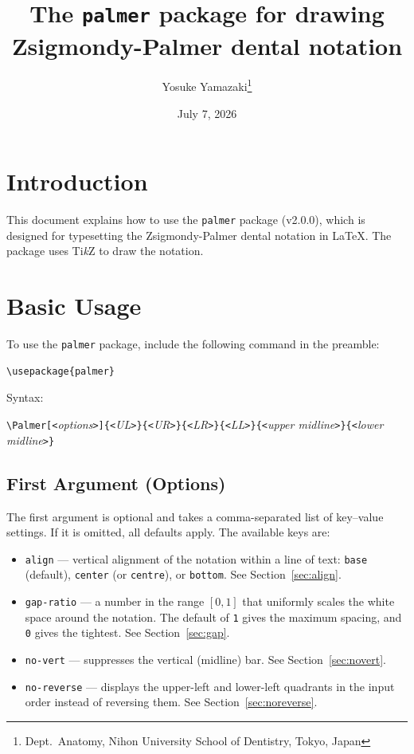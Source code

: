 \documentclass[12pt]{ltjsarticle}
\begin{document}
\title{The \texttt{palmer} package for drawing Zsigmondy-Palmer dental notation}
\author{Yosuke Yamazaki\thanks{Dept.\ Anatomy, Nihon University School of Dentistry, Tokyo, Japan}}
\date{July 7, 2026}

\maketitle

\section{Introduction}
This document explains how to use the \texttt{palmer} package (v2.0.0), which is designed for typesetting the Zsigmondy-Palmer dental notation in \LaTeX. The package uses Ti\textit{k}Z to draw the notation.


\section{Basic Usage}
To use the \texttt{palmer} package, include the following command in the preamble:

\begin{verbatim}
\usepackage{palmer}
\end{verbatim}

Syntax:

    \verb|\Palmer[<|\textit{options}\verb|>]{<|\textit{UL}\verb|>}{<|\textit{UR}\verb|>}{<|\textit{LR}\verb|>}{<|\textit{LL}\verb|>}{<|\textit{upper midline}\verb|>}{<|\textit{lower midline}\verb|>}|


\subsection{First Argument (Options)}
\label{sec:options}

The first argument is optional and takes a comma-separated list of key--value settings. If it is omitted, all defaults apply. The available keys are:

\begin{itemize}
    \item \texttt{align} --- vertical alignment of the notation within a line of text: \texttt{base} (default), \texttt{center} (or \texttt{centre}), or \texttt{bottom}. See Section~\ref{sec:align}.
    \item \texttt{gap-ratio} --- a number in the range $[0,1]$ that uniformly scales the white space around the notation. The default of \texttt{1} gives the maximum spacing, and \texttt{0} gives the tightest. See Section~\ref{sec:gap}.
    \item \texttt{no-vert} --- suppresses the vertical (midline) bar. See Section~\ref{sec:novert}.
    \item \texttt{no-reverse} --- displays the upper-left and lower-left quadrants in the input order instead of reversing them. See Section~\ref{sec:noreverse}.
\end{itemize}
\end{document}
